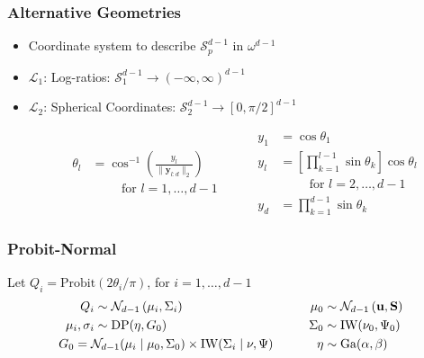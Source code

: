 \documentclass[aspectratio=169]{beamer}
\begin{document}
\begin{frame}
  \frametitle{Alternative Geometries}
  \begin{itemize}
    \item Coordinate system to describe $\mathcal{S}_p^{d-1}$ in $\omega^{d-1}$
    \item $\mathcal{L}_1$: Log-ratios:  $\mathcal{S}_1^{d-1} \rightarrow (-\infty,\infty)^{d-1}$
    \item $\mathcal{L}_2$: Spherical Coordinates: $\mathcal{S}_2^{d-1} \rightarrow [0,\pi/2]^{d-1}$
    
      \begin{equation*}
        \begin{aligned}
        \theta_l &= \cos^{-1}\left(\frac{y_l}{\lVert \bm{y}_{l:d}\rVert_2}\right)\\
        &\hspace{1cm}\text{for }l = 1,\ldots,d-1
        \end{aligned}
        \hspace{1cm}
        \begin{aligned}
          y_1 &= \cos\theta_1\\
          y_l &= \left[{\textstyle\prod}_{k = 1}^{l-1}\sin\theta_k\right]\cos\theta_l\\
          &\hspace{1cm}\text{for }l = 2,\ldots,d-1\\
          y_d &= {\textstyle\prod}_{k = 1}^{d-1}\sin\theta_k
        \end{aligned}
      \end{equation*}
  \end{itemize}
\end{frame}

\begin{frame}
  \frametitle{Probit-Normal}
  Let $Q_i = \text{Probit}(2\theta_i / \pi)$, for $i = 1,\ldots,d-1$
  \begin{equation*}
    \begin{aligned}
                Q_i &\sim \mathcal{N}_{d-1}\left(\mu_i, \Sigma_i\right)\\
    \mu_i, \sigma_i &\sim \text{DP}(\eta, G_0)\\
                    &\hspace{-1cm}G_0 =
                      \mathcal{N}_{d-1}(\mu_i\mid\mu_0,\Sigma_0)\times \text{IW}(\Sigma_i\mid\nu,\Psi)
    \end{aligned}
    \hspace{1cm}
    \begin{aligned}
              \mu_0 &\sim \mathcal{N}_{d-1}\left({\bf u},{\bf S}\right)\\
           \Sigma_0 &\sim \text{IW}(\nu_0,\Psi_0)\\
               \eta &\sim \text{Ga}(\alpha, \beta)
    \end{aligned}
  \end{equation*}
\end{frame}
\end{document}
